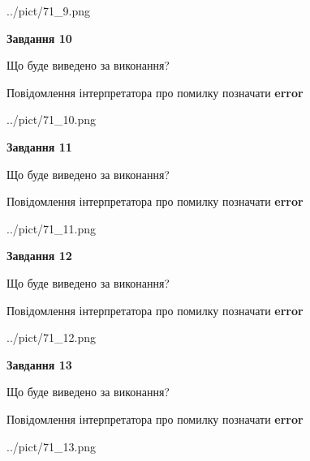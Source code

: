 \documentclass[11pt, ukrainian]{article}
\begin{document}
{\begin {large}
\begin{center}
	{../pict/71_9.png}
\end{center}
\newpage

{\begin {center}\textbf{Завдання 10}\end {center}}\par
Що буде виведено за виконання? \par
Повідомлення інтерпретатора про помилку позначати \textbf{error}

\begin{center}
	{../pict/71_10.png}
\end{center}
\newpage

{\begin {center}\textbf{Завдання 11}\end {center}}\par
Що буде виведено за виконання? \par
Повідомлення інтерпретатора про помилку позначати \textbf{error}

\begin{center}
	{../pict/71_11.png}
\end{center}
\newpage

{\begin {center}\textbf{Завдання 12}\end {center}}\par
Що буде виведено за виконання? \par
Повідомлення інтерпретатора про помилку позначати \textbf{error}

\begin{center}
	{../pict/71_12.png}
\end{center}
\newpage

{\begin {center}\textbf{Завдання 13}\end {center}}\par
Що буде виведено за виконання? \par
Повідомлення інтерпретатора про помилку позначати \textbf{error}

\begin{center}
	{../pict/71_13.png}
\end{center}
\newpage


\end{large}}
\end{document}
